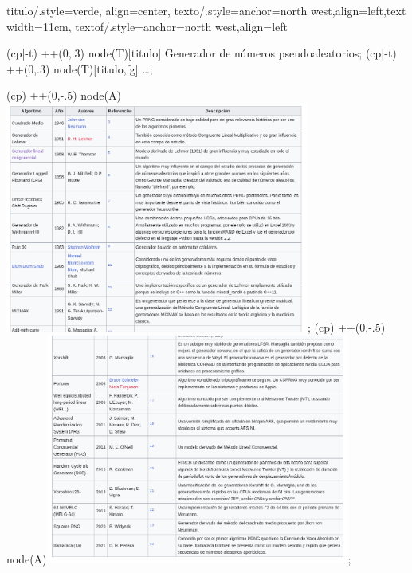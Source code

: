 \documentclass[fleqn]{beamer}
\begin{document}
\begin{zframe}{
  titulo/.style={verde, align=center},
  texto/.style={anchor=north west,align=left,text width=11cm},
  textof/.style={anchor=north west,align=left}
}

(cp|-t) ++(0,.3) node(T)[titulo]{
\LARGE Generador de números pseudoaleatorios};
(cp|-t) ++(0,.3) node(T)[titulo,fg]{
\ldots};

(cp) ++(0,-.5) node(A){\includegraphics[width=10cm]{prng1.png}};
(cp) ++(0,-.5) node(A){\includegraphics[width=10cm]{prng2.png}};
                          
\end{zframe}
          
\end{document}
